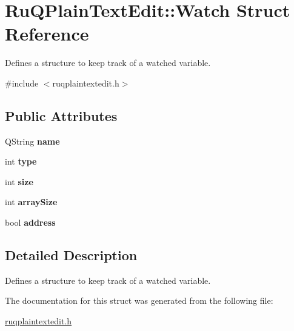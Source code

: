 \hypertarget{struct_ru_q_plain_text_edit_1_1_watch}{}\section{Ru\+Q\+Plain\+Text\+Edit\+:\+:Watch Struct Reference}
\label{struct_ru_q_plain_text_edit_1_1_watch}


Defines a structure to keep track of a watched variable.  




{\ttfamily \#include $<$ruqplaintextedit.\+h$>$}

\subsection*{Public Attributes}
\begin{DoxyCompactItemize}
\item 
\hypertarget{struct_ru_q_plain_text_edit_1_1_watch_a1be872e72e8414ba1efa6a36738914e3}{}Q\+String {\bfseries name}\label{struct_ru_q_plain_text_edit_1_1_watch_a1be872e72e8414ba1efa6a36738914e3}

\item 
\hypertarget{struct_ru_q_plain_text_edit_1_1_watch_a9ba866a2946627df2dc301bb7eb1279a}{}int {\bfseries type}\label{struct_ru_q_plain_text_edit_1_1_watch_a9ba866a2946627df2dc301bb7eb1279a}

\item 
\hypertarget{struct_ru_q_plain_text_edit_1_1_watch_a1bf8cee83d981ae218097934125f5ef0}{}int {\bfseries size}\label{struct_ru_q_plain_text_edit_1_1_watch_a1bf8cee83d981ae218097934125f5ef0}

\item 
\hypertarget{struct_ru_q_plain_text_edit_1_1_watch_a092b03dbdf3af5c7dcfd12940c19a1c3}{}int {\bfseries array\+Size}\label{struct_ru_q_plain_text_edit_1_1_watch_a092b03dbdf3af5c7dcfd12940c19a1c3}

\item 
\hypertarget{struct_ru_q_plain_text_edit_1_1_watch_a8a69b8fd93364e59cb025dac18cadc64}{}bool {\bfseries address}\label{struct_ru_q_plain_text_edit_1_1_watch_a8a69b8fd93364e59cb025dac18cadc64}

\end{DoxyCompactItemize}


\subsection{Detailed Description}
Defines a structure to keep track of a watched variable. 

The documentation for this struct was generated from the following file\+:\begin{DoxyCompactItemize}
\item 
\hyperlink{ruqplaintextedit_8h}{ruqplaintextedit.\+h}\end{DoxyCompactItemize}
